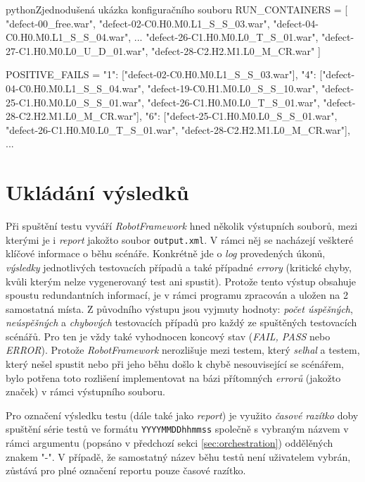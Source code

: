 \documentclass[czech, ma, kiv, he, iso690alph, pdf, viewonly]{fasthesis}
\begin{document}
    \begin{code}{python}{Zjednodušená ukázka konfiguračního souboru \label{lst:configuration}}
RUN_CONTAINERS = [
    "defect-00_free.war",
    "defect-02-C0.H0.M0.L1_S_S_03.war",
    "defect-04-C0.H0.M0.L1_S_S_04.war",
    ...
    "defect-26-C1.H0.M0.L0_T_S_01.war",
    "defect-27-C1.H0.M0.L0_U_D_01.war",
    "defect-28-C2.H2.M1.L0_M_CR.war"
]

POSITIVE_FAILS = {
    "1": ["defect-02-C0.H0.M0.L1_S_S_03.war"],
    "4": ["defect-04-C0.H0.M0.L1_S_S_04.war", "defect-19-C0.H1.M0.L0_S_S_10.war", "defect-25-C1.H0.M0.L0_S_S_01.war", "defect-26-C1.H0.M0.L0_T_S_01.war", "defect-28-C2.H2.M1.L0_M_CR.war"],
    "6": ["defect-25-C1.H0.M0.L0_S_S_01.war", "defect-26-C1.H0.M0.L0_T_S_01.war", "defect-28-C2.H2.M1.L0_M_CR.war"],
    ...
}\end{code}
    
    \section{Ukládání výsledků}
    Při spuštění testu vyváří \textit{RobotFramework} hned několik výstupních souborů, mezi kterými je i \textit{report} jakožto soubor \verb|output.xml|. V rámci něj se nacházejí veškteré klíčové informace o běhu scénáře. Konkrétně jde o \textit{log} provedených úkonů, \textit{výsledky} jednotlivých testovacích případů a také případné \textit{errory} (kritické chyby, kvůli kterým nelze vygenerovaný test ani spustit). Protože tento výstup obsahuje spoustu redundantních informací, je v rámci programu zpracován a uložen na 2 samostatná místa. Z původního výstupu jsou vyjmuty hodnoty: \textit{počet úspěšných}, \textit{neúspěšných} a \textit{chybových} testovacích případů pro každý ze spuštěných testovacích scénářů. Pro ten je vždy také vyhodnocen koncový stav (\textit{FAIL, PASS} nebo \textit{ERROR}). Protože \textit{RobotFramework} nerozlišuje mezi testem, který \emph{selhal} a testem, který nešel spustit nebo při jeho běhu došlo k chybě nesouvisející se scénářem, bylo potřena toto rozlišení implementovat na bázi přítomných \textit{errorů} (jakožto značek) v rámci výstupního souboru. 

    Pro označení výsledku testu (dále také jako \emph{report}) je využito \textit{časové razítko} doby spuštění série testů ve formátu \verb|YYYYMMDDhhmmss| společně s vybraným názvem v rámci argumentu (popsáno v předchozí sekci \ref{sec:orchestration}) oddělěných znakem "-". V případě, že samostatný název běhu testů není uživatelem vybrán, zůstává pro plné označení reportu pouze časové razítko.
\end{document}
